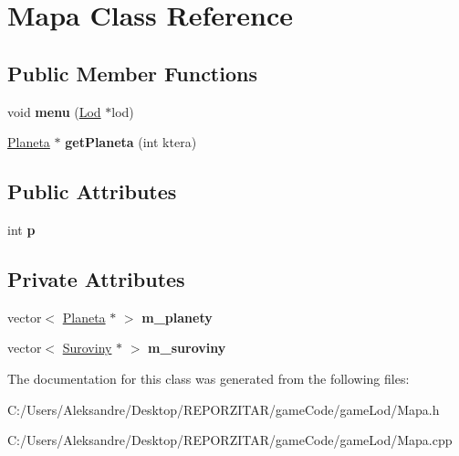 \hypertarget{class_mapa}{}\section{Mapa Class Reference}
\label{class_mapa}
\subsection*{Public Member Functions}
\begin{DoxyCompactItemize}
\item 
\mbox{\label{class_mapa_ac1ac035533602e1f6355af086d33135b}} 
void {\bfseries menu} (\hyperlink{class_lod}{Lod} $\ast$lod)
\item 
\mbox{\label{class_mapa_a4af8fe41fcb6fb60cd6133d2caaa14c8}} 
\hyperlink{class_planeta}{Planeta} $\ast$ {\bfseries get\+Planeta} (int ktera)
\end{DoxyCompactItemize}
\subsection*{Public Attributes}
\begin{DoxyCompactItemize}
\item 
\mbox{\label{class_mapa_a4cdb1a3c3703635166f32b45100ad7af}} 
int {\bfseries p}
\end{DoxyCompactItemize}
\subsection*{Private Attributes}
\begin{DoxyCompactItemize}
\item 
\mbox{\label{class_mapa_af4f75f63dd480f32ff966685929604f8}} 
vector$<$ \hyperlink{class_planeta}{Planeta} $\ast$ $>$ {\bfseries m\+\_\+planety}
\item 
\mbox{\label{class_mapa_abf339eb16ad75ec77190227b40f4cc8c}} 
vector$<$ \hyperlink{class_suroviny}{Suroviny} $\ast$ $>$ {\bfseries m\+\_\+suroviny}
\end{DoxyCompactItemize}


The documentation for this class was generated from the following files\+:\begin{DoxyCompactItemize}
\item 
C\+:/\+Users/\+Aleksandre/\+Desktop/\+R\+E\+P\+O\+R\+Z\+I\+T\+A\+R/game\+Code/game\+Lod/Mapa.\+h\item 
C\+:/\+Users/\+Aleksandre/\+Desktop/\+R\+E\+P\+O\+R\+Z\+I\+T\+A\+R/game\+Code/game\+Lod/Mapa.\+cpp\end{DoxyCompactItemize}
